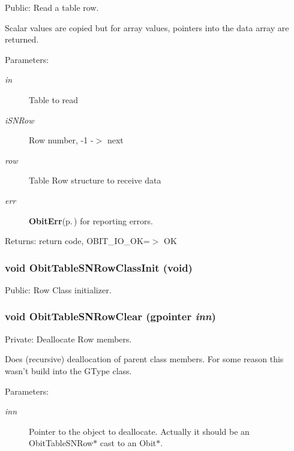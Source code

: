 Public: Read a table row. 

Scalar values are copied but for array values, pointers into the data array are returned. \begin{Desc}
\item[Parameters:]
\begin{description}
\item[{\em in}]Table to read \item[{\em i\-SNRow}]Row number, -1 -$>$ next \item[{\em row}]Table Row structure to receive data \item[{\em err}]{\bf Obit\-Err}{\rm (p.\,\pageref{structObitErr})} for reporting errors. \end{description}
\end{Desc}
\begin{Desc}
\item[Returns:]return code, OBIT\_\-IO\_\-OK=$>$ OK \end{Desc}
\subsubsection{\setlength{\rightskip}{0pt plus 5cm}void Obit\-Table\-SNRow\-Class\-Init (void)}\label{ObitTableSN_8c_a26}


Public: Row Class initializer. 

\subsubsection{\setlength{\rightskip}{0pt plus 5cm}void Obit\-Table\-SNRow\-Clear (gpointer {\em inn})}\label{ObitTableSN_8c_a7}


Private: Deallocate Row members. 

Does (recursive) deallocation of parent class members. For some reason this wasn't build into the GType class. \begin{Desc}
\item[Parameters:]
\begin{description}
\item[{\em inn}]Pointer to the object to deallocate. Actually it should be an Obit\-Table\-SNRow$\ast$ cast to an Obit$\ast$. \end{description}
\end{Desc}
